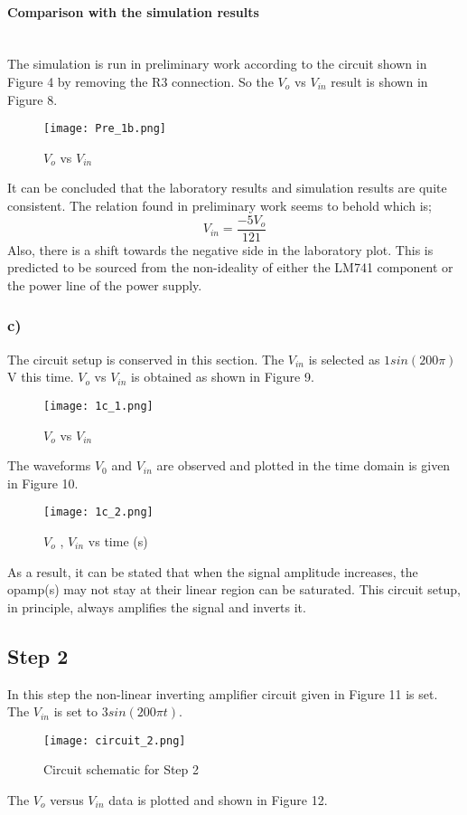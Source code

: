 \documentclass[letterpaper,12pt]{article}
\begin{document}
\paragraph{Comparison with the simulation results}
 \mbox{}
\\
The simulation is run in preliminary work according to the circuit shown in Figure 4 by removing the R3 connection. So the \(V_{o}\) vs \(V_{in}\) result is shown in Figure 8.
\begin{figure}[H]
	\centering
   \texttt{[image: Pre\_1b.png]}
   \caption{\(V_{o}\) vs \(V_{in}\)}
\end{figure}
It can be concluded that the laboratory results and simulation results are quite consistent. The relation found in preliminary work seems to behold which is;
\[V_{in} = \frac{-5 V_o}{121} \]
Also, there is a shift towards the negative side in the laboratory plot. This is predicted to be sourced from the non-ideality of either the LM741 component or the power line of the power supply.
\subsubsection{c)}
The circuit setup is conserved in this section. The \(V_{in}\) is selected as \(1sin(200\pi)\) V this time. \(V_{o}\) vs \(V_{in}\) is obtained as shown in Figure 9.
\begin{figure}[H]
	\centering
   \texttt{[image: 1c\_1.png]}
   \caption{\(V_{o}\) vs \(V_{in}\)}
\end{figure}
The waveforms \(V_0\) and \(V_{in}\) are observed and plotted in the time domain is given in Figure 10.
\begin{figure}[H]
	\centering
   \texttt{[image: 1c\_2.png]}
   \caption{\(V_{o}\) , \(V_{in}\) vs time (s) }
\end{figure}
As a result, it can be stated that when the signal amplitude increases, the opamp(s) may not stay at their linear region can be saturated. This circuit setup, in principle, always amplifies the signal and inverts it.
\subsection{Step 2}
In this step the non-linear inverting amplifier circuit given in Figure 11 is set. The \(V_{in}\) is set to \(3sin(200\pi t)\).
\begin{figure}[H]
	\centering
   \texttt{[image: circuit\_2.png]}
   \caption{Circuit schematic for Step 2}
\end{figure}
The \(V_{o}\) versus \(V_{in}\) data is plotted and shown in Figure 12. 
\end{document}
